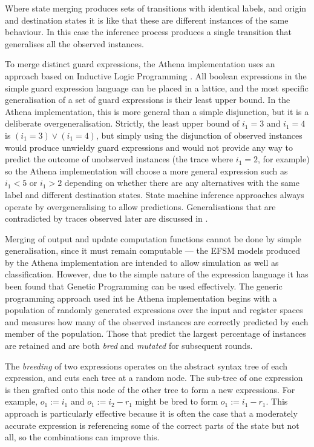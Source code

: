Where state merging produces sets of transitions with identical labels, and origin and destination states it is like that these are different instances of the same behaviour. In this case the inference process produces a single transition that generalises all the observed instances.

To merge distinct guard expressions, the Athena implementation uses an approach based on Inductive Logic Programming \cite{ILP}. All boolean expressions in the simple guard expression language can be placed in a lattice, and the most specific generalisation of a set of guard expressions is their least upper bound. In the Athena implementation, this is more general than a simple disjunction, but it is a deliberate overgeneralisation. Strictly, the least upper bound of $i_1 = 3$ and $i_1 = 4$ is $(i_1 = 3) \lor (i_1 = 4)$, but simply using the disjunction of observed instances would produce unwieldy guard expressions and would not provide any way to predict the outcome of unobserved instances (the trace where $i_1 = 2$, for example) so the Athena implementation will choose a more general expression such as $i_1 < 5$ or $i_1 > 2$ depending on whether there are any alternatives with the same label and different destination states. State machine inference approaches always operate by overgeneralising to allow predictions. Generalisations that are contradicted by traces observed later are discussed in .

Merging of output and update computation functions cannot be done by simple generalisation, since it must remain computable --- the EFSM models produced by the Athena implementation are intended to allow simulation as well as classification. However, due to the simple nature of the expression language it has been found that Genetic Programming \cite{} can be used effectively. The generic programming approach used int he Athena implementation begins with a population of randomly generated expressions over the input and register spaces and measures how many of the observed instances are correctly predicted by each member of the population. Those that predict the largest percentage of instances are retained and are both \emph{bred} and \emph{mutated} for subsequent rounds. 

The \emph{breeding} of two expressions operates on the abstract syntax tree of each expression, and cuts each tree at a random node. The sub-tree of one expression is then grafted onto this node of the other tree to form a new expressions. For example, $o_1 := i_1$ and $o_1 := i_2 - r_1$ might be bred to form $o_1 := i_1 - r_1$. This approach is particularly effective because it is often the case that a moderately accurate expression is referencing some of the correct parts of the state but not all, so the combinations can improve this.

